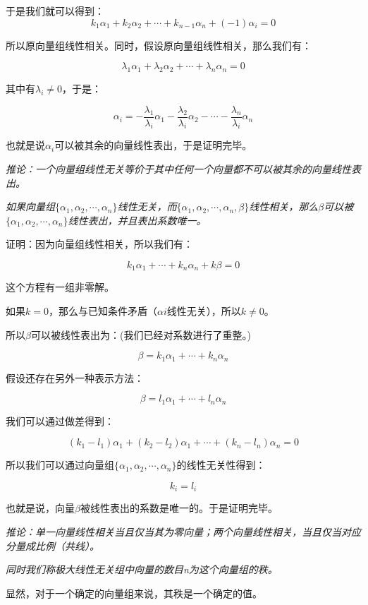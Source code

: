 \documentclass[a4paper]{ctexart}
\begin{document}
于是我们就可以得到：
$$
k_{1}\alpha_{1}+k_{2}\alpha_{2}+\cdots+k_{n-1}\alpha_{n}+(-1)\alpha_{i}=0
$$

所以原向量组线性相关。同时，假设原向量组线性相关，那么我们有：

$$
\lambda_1\alpha_1+\lambda_2\alpha_2+\cdots+\lambda_n\alpha_n=0
$$

其中有$\lambda_{i}\neq 0$，于是：

$$
\alpha_{i}=-\frac{\lambda_{1}}{\lambda_{i}}\alpha_{1}-\frac{\lambda_{2}}{\lambda_{i}}\alpha_{2}-\cdots-\frac{\lambda_{n}}{\lambda_{i}}\alpha_{n}
$$

也就是说$\alpha_{i}$可以被其余的向量线性表出，于是证明完毕。

\textit{推论：一个向量组线性无关等价于其中任何一个向量都不可以被其余的向量线性表出。}

\textit{如果向量组$\{\alpha_1,\alpha_2,\cdots,\alpha_n\}$线性无关，而$\{\alpha_1,\alpha_2,\cdots,\alpha_n,\beta\}$线性相关，那么$\beta$可以被$\{\alpha_1,\alpha_2,\cdots,\alpha_n\}$线性表出，并且表出系数唯一。}

证明：因为向量组线性相关，所以我们有：

$$
k_{1}\alpha_{1}+\cdots+k_{n}\alpha_{n}+k\beta=0
$$

这个方程有一组非零解。

如果$k=0$，那么与已知条件矛盾（$\alpha{i}$线性无关），所以$k\neq 0 $。

所以$\beta$可以被线性表出为：(我们已经对系数进行了重整。)

$$
\beta=k_{1}\alpha_{1}+\cdots+k_{n}\alpha_{n}
$$

假设还存在另外一种表示方法：

$$
\beta=l_{1}\alpha_{1}+\cdots+l_{n}\alpha_{n}
$$

我们可以通过做差得到：

$$
(k_{1}-l_{1})\alpha_{1}+(k_{2}-l_{2})\alpha_{1}+\cdots+(k_{n}-l_{n})\alpha_{n}=0
$$

所以我们可以通过向量组$\{\alpha_1,\alpha_2,\cdots,\alpha_n\}$的线性无关性得到：

$$
k_{i}=l_{i}
$$

也就是说，向量$\beta$被线性表出的系数是唯一的。于是证明完毕。

\textit{推论：单一向量线性相关当且仅当其为零向量；两个向量线性相关，当且仅当对应分量成比例（共线）。}

\textit{同时我们称极大线性无关组中向量的数目n为这个向量组的秩。}

显然，对于一个确定的向量组来说，其秩是一个确定的值。
\end{document}
